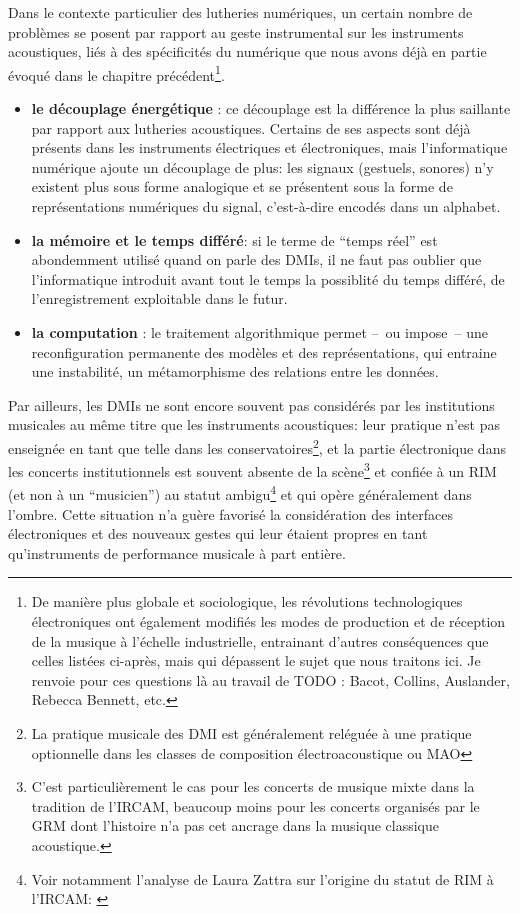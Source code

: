 \noindent Dans le contexte particulier des lutheries numériques, un certain nombre de problèmes se posent par rapport au geste instrumental sur les instruments acoustiques, liés à des spécificités du numérique que nous avons déjà en partie évoqué dans le chapitre précédent\footnote{De manière plus globale et sociologique, les révolutions technologiques électroniques ont également modifiés les modes de production et de réception de la musique à l'échelle industrielle, entrainant d'autres conséquences que celles listées ci-après, mais qui dépassent le sujet que nous traitons ici. Je renvoie pour ces questions là au travail de TODO : Bacot, Collins, Auslander, Rebecca Bennett, etc.}.
\vspace{-1em}
\begin{itemize}[noitemsep]
\item \textbf{le découplage énergétique} : ce découplage est la différence la plus saillante par rapport aux lutheries acoustiques. Certains de ses aspects sont déjà présents dans les instruments électriques et électroniques, mais l'informatique numérique ajoute un découplage de plus: les signaux (gestuels, sonores) n'y existent plus sous forme analogique et se présentent sous la forme de représentations numériques du signal, c'est-à-dire encodés dans un alphabet.
\item \textbf{la mémoire et le temps différé}: si le terme de ``temps réel'' est abondemment utilisé quand on parle des \glspl{DMI}, il ne faut pas oublier que l'informatique introduit avant tout le temps la possiblité du temps différé, de l'enregistrement exploitable dans le futur.
\item \textbf{la computation} : le traitement algorithmique permet --~ou impose~-- une reconfiguration permanente des modèles et des représentations, qui entraine une instabilité, un métamorphisme des relations entre les données.
\end{itemize}
\noindent Par ailleurs, les \glspl{DMI} ne sont encore souvent pas considérés par les institutions musicales au même titre que les instruments acoustiques: leur pratique n'est pas enseignée en tant que telle dans les conservatoires\footnote{La pratique musicale des \gls{DMI} est généralement reléguée à une pratique optionnelle dans les classes de composition électroacoustique ou \gls{MAO}}, et la partie électronique dans les concerts institutionnels est souvent absente de la scène\footnote{C'est particulièrement le cas pour les concerts de musique mixte dans la tradition de l'\gls{IRCAM}, beaucoup moins pour les concerts organisés par le \gls{GRM} dont l'histoire n'a pas cet ancrage dans la musique classique acoustique.} et confiée à un \gls{RIM} (et non à un ``musicien'') au statut ambigu\footnote{Voir notamment l'analyse de Laura Zattra sur l'origine du statut de \gls{RIM} à l'\gls{IRCAM}: \cite{zattra_les_2013}} et qui opère généralement dans l'ombre. Cette situation n'a guère favorisé la considération des interfaces électroniques et des nouveaux gestes qui leur étaient propres en tant qu'instruments de performance musicale à part entière.

